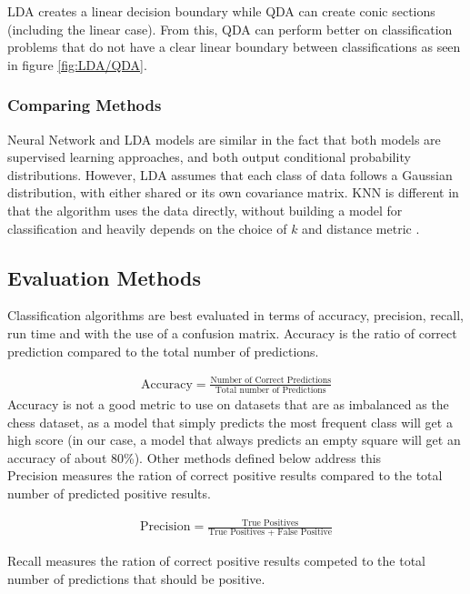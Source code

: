 \documentclass{article}
\begin{document}
\begin{multicols}{2}


LDA creates a linear decision boundary while QDA can create conic sections (including the linear case). From this, QDA can perform better on classification problems that do not have a clear linear boundary between classifications as seen in figure \ref{fig:LDA/QDA}. 

\subsubsection{Comparing Methods}
Neural Network and LDA models are similar in the fact that both models are supervised learning approaches, and both output conditional probability distributions. However, LDA assumes that each class of data follows a Gaussian distribution, with either shared or its own covariance matrix.
KNN is different in that the algorithm uses the data directly, without building a model for classification and heavily depends on the choice of $k$ and distance metric \cite{PWork}. 

\subsection{Evaluation Methods}
Classification algorithms are best evaluated in terms of accuracy, precision, recall, run time and with the use of a confusion matrix. Accuracy is the ratio of correct prediction compared to the total number of predictions. 

\begin{align*}
\mbox{Accuracy} = \frac{\mbox{Number of Correct Predictions}}{\mbox{Total number of Predictions}}
\end{align*}
Accuracy is not a good metric to use on datasets that are as imbalanced as the chess dataset, as a model that simply predicts the most frequent class will get a high score (in our case, a model that always predicts an empty square will get an accuracy of about 80\%). Other methods defined below address this\\

Precision measures the ration of correct positive results compared to the total number of predicted positive results.

\begin{align*}
\mbox{Precision} = \frac{\mbox{True Positives}}{\mbox{True Positives + False Positive}}
\end{align*}

Recall measures the ration of correct positive results competed to the total number of predictions that should be positive.   


\end{multicols}
\end{document}
